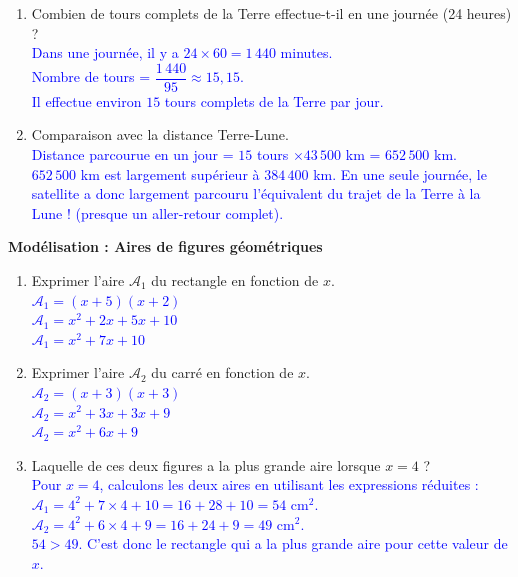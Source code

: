 \documentclass[a4paper]{book}
\begin{document}
{\begin{exercice}
\begin{enumerate}
            \item Combien de tours complets de la Terre effectue-t-il en une journée (24 heures) ? \\
            \textcolor{blue}{Dans une journée, il y a $24 \times 60 = 1\,440$ minutes. \\ Nombre de tours = $\dfrac{1\,440}{95} \approx 15,15$. \\ Il effectue environ $15$ tours complets de la Terre par jour.}

            \item Comparaison avec la distance Terre-Lune. \\
            \textcolor{blue}{Distance parcourue en un jour = $15$ tours $\times 43\,500$ km = $652\,500$ km. \\ $652\,500$ km est largement supérieur à $384\,400$ km. En une seule journée, le satellite a donc largement parcouru l'équivalent du trajet de la Terre à la Lune ! (presque un aller-retour complet).}
        \end{enumerate}
    \end{exercice}

    \vspace{0.5cm}

    \begin{exercice}
        \textbf{Modélisation : Aires de figures géométriques} 
    
        \begin{enumerate}
            \item Exprimer l'aire $\mathcal{A}_1$ du rectangle en fonction de $x$. \\
            \textcolor{blue}{$\mathcal{A}_1 = (x + 5)(x + 2)$ \\ $\mathcal{A}_1 = x^2 + 2x + 5x + 10$ \\ $\mathcal{A}_1 = x^2 + 7x + 10$}
            
            \item Exprimer l'aire $\mathcal{A}_2$ du carré en fonction de $x$. \\
            \textcolor{blue}{$\mathcal{A}_2 = (x + 3)(x + 3)$ \\ $\mathcal{A}_2 = x^2 + 3x + 3x + 9$ \\ $\mathcal{A}_2 = x^2 + 6x + 9$}
            
            \item Laquelle de ces deux figures a la plus grande aire lorsque $x = 4$ ? \\
            \textcolor{blue}{Pour $x = 4$, calculons les deux aires en utilisant les expressions réduites : \\ $\mathcal{A}_1 = 4^2 + 7 \times 4 + 10 = 16 + 28 + 10 = 54$ cm$^2$. \\ $\mathcal{A}_2 = 4^2 + 6 \times 4 + 9 = 16 + 24 + 9 = 49$ cm$^2$. \\ $54 > 49$. C'est donc le rectangle qui a la plus grande aire pour cette valeur de $x$.}
        \end{enumerate}
    \end{exercice}


}
\end{document}
